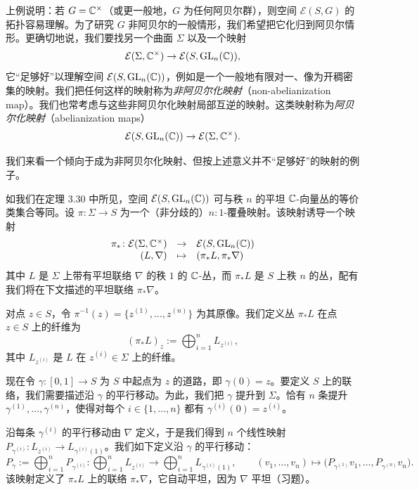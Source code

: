 
上例说明：若 $G=\mathbb{C}^\times$（或更一般地，$G$ 为任何阿贝尔群），则空间 $\mathcal{E}(S,G)$ 的拓扑容易理解。为了研究 $G$ 非阿贝尔的一般情形，我们希望把它化归到阿贝尔情形。更确切地说，我们要找另一个曲面 $\Sigma$ 以及一个映射
\[
\mathcal{E}(\Sigma,\mathbb{C}^\times)\to\mathcal{E}(S,\operatorname{GL}_n(\mathbb{C})),
\]
它“足够好”以理解空间 $\mathcal{E}(S,\operatorname{GL}_n(\mathbb{C}))$，例如是一个一般地有限对一、像为开稠密集的映射。我们把任何这样的映射称为\emph{非阿贝尔化映射}（non-abelianization map）。我们也常考虑与这些非阿贝尔化映射局部互逆的映射。这类映射称为\emph{阿贝尔化映射}（abelianization maps）
\[
\mathcal{E}(S,\operatorname{GL}_n(\mathbb{C}))\to\mathcal{E}(\Sigma,\mathbb{C}^\times).
\]

我们来看一个倾向于成为非阿贝尔化映射、但按上述意义并不“足够好”的映射的例子。

\begin{example}[13.2]
如我们在定理 3.30 中所见，空间 $\mathcal{E}(S,\operatorname{GL}_n(\mathbb{C}))$ 可与秩 $n$ 的平坦 $\mathbb{C}$-向量丛的等价类集合等同。设 $\pi\colon\Sigma\to S$ 为一个（非分歧的）$n:1$-覆叠映射。该映射诱导一个映射
\[
\begin{array}{rcl}
\pi_*\colon\mathcal{E}(\Sigma,\mathbb{C}^\times)&\to&\mathcal{E}(S,\operatorname{GL}_n(\mathbb{C}))\\
(L,\nabla)&\mapsto&(\pi_*L,\pi_*\nabla)
\end{array}
\]
其中 $L$ 是 $\Sigma$ 上带有平坦联络 $\nabla$ 的秩 $1$ 的 $\mathbb{C}$-丛，而 $\pi_*L$ 是 $S$ 上秩 $n$ 的丛，配有我们将在下文描述的平坦联络 $\pi_*\nabla$。

对点 $z\in S$，令 $\pi^{-1}(z)=\{z^{(1)},\dots,z^{(n)}\}$ 为其原像。我们定义丛 $\pi_*L$ 在点 $z\in S$ 上的纤维为
\[
(\pi_*L)_z:=\bigoplus_{i=1}^{n}L_{z^{(i)}},
\]
其中 $L_{z^{(i)}}$ 是 $L$ 在 $z^{(i)}\in\Sigma$ 上的纤维。

现在令 $\gamma\colon[0,1]\to S$ 为 $S$ 中起点为 $z$ 的道路，即 $\gamma(0)=z$。要定义 $S$ 上的联络，我们需要描述沿 $\gamma$ 的平行移动。为此，我们把 $\gamma$ 提升到 $\Sigma$。恰有 $n$ 条提升 $\gamma^{(1)},\dots,\gamma^{(n)}$，使得对每个 $i\in\{1,\dots,n\}$ 都有 $\gamma^{(i)}(0)=z^{(i)}$。
\end{example}

沿每条 $\gamma^{(i)}$ 的平行移动由 $\nabla$ 定义，于是我们得到 $n$ 个线性映射 $P_{\gamma^{(i)}}\colon L_{z^{(i)}}\to L_{\gamma^{(i)}(1)}$。我们如下定义沿 $\gamma$ 的平行移动：
\[
P_\gamma:=\bigoplus_{i=1}^{n}P_{\gamma^{(i)}}\colon
\bigoplus_{i=1}^{n}L_{z^{(i)}}\longrightarrow\bigoplus_{i=1}^{n}L_{\gamma^{(i)}(1)},
\qquad
(v_1,\dots,v_n)\mapsto\bigl(P_{\gamma^{(1)}}v_1,\dots,P_{\gamma^{(n)}}v_n\bigr).
\]
该映射定义了 $\pi_*L$ 上的联络 $\pi_*\nabla$，它自动平坦，因为 $\nabla$ 平坦（习题）。

